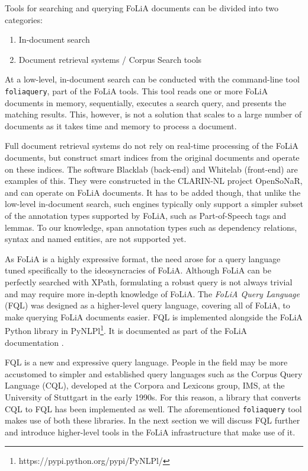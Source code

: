Tools for searching and querying FoLiA documents can be divided into two
categories:

\begin{enumerate}
 \item In-document search
 \item Document retrieval systems / Corpus Search tools
\end{enumerate}

At a low-level, in-document search can be conducted with the command-line tool
\texttt{foliaquery}, part of the FoLiA tools. This tool reads one or more FoLiA
documents in memory, sequentially, executes a search query, and presents the
matching results. This, however, is not a solution that scales to a large
number of documents as it takes time and memory to process a document.

Full document retrieval systems do not rely on real-time processing of the FoLiA
documents, but construct smart indices from the original documents and operate
on these indices. The software Blacklab (back-end) and Whitelab (front-end) are
examples of this. They were constructed in the CLARIN-NL project OpenSoNaR, and
can operate on FoLiA documents. It has to be added though, that unlike the
low-level in-document search, such engines typically only support a simpler subset of
the annotation types supported by FoLiA, such as Part-of-Speech tags and
lemmas. To our knowledge, span annotation types such as dependency relations,
syntax and named entities, are not supported yet.

As FoLiA is a highly expressive format, the need arose for a query language
tuned specifically to the ideosyncracies of FoLiA. Although FoLiA can be
perfectly searched with XPath, formulating a robust query is not always trivial
and may require more in-depth knowledge of FoLiA. The \emph{FoLiA Query
Language} (FQL) was designed as a higher-level query language, covering all of
FoLiA, to make querying FoLiA documents easier. FQL is implemented alongside
the FoLiA Python library in
PyNLPl\footnote{https://pypi.python.org/pypi/PyNLPl/}. It is documented as part
of the FoLiA documentation \cite{FOLIA}.

FQL is a new and expressive query language. People in the field may be more
accustomed to simpler and established query languages such as the Corpus Query
Language (CQL), developed at the Corpora and Lexicons group, IMS, at the
University of Stuttgart in the early 1990s. For this reason, a library that
converts CQL to FQL has been implemented as well. The aforementioned
\texttt{foliaquery} tool makes use of both these libraries. In the next section
we will discuss FQL further and introduce higher-level tools in the FoLiA
infrastructure that make use of it.

